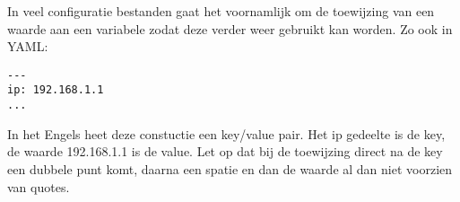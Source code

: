 In veel configuratie bestanden gaat het voornamlijk om de toewijzing van een waarde aan een variabele zodat deze verder weer gebruikt kan worden. Zo ook in YAML:
\begin{verbatim}
---
ip: 192.168.1.1
...
\end{verbatim}

In het Engels heet deze constuctie een key/value pair. Het ip gedeelte is de key, de waarde 192.168.1.1 is de value. Let op dat bij de toewijzing direct na de key een dubbele punt komt, daarna een spatie en dan de waarde al dan niet voorzien van quotes.

